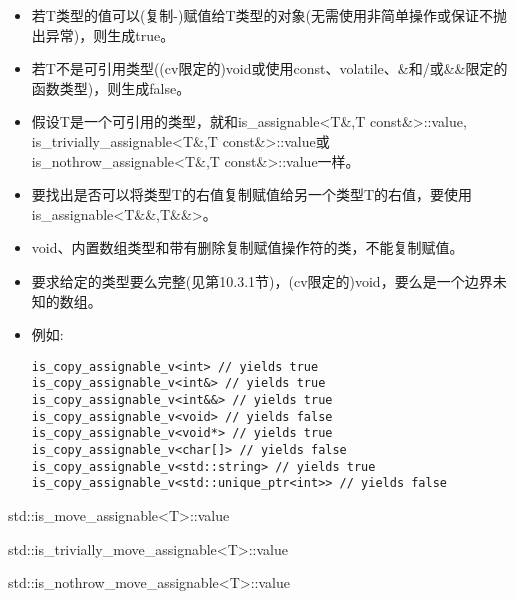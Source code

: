 \begin{itemize}
\item
若T类型的值可以(复制-)赋值给T类型的对象(无需使用非简单操作或保证不抛出异常)，则生成true。

\item
若T不是可引用类型((cv限定的)void或使用const、volatile、\&和/或\&\&限定的函数类型)，则生成false。
 
\item
假设T是一个可引用的类型，就和is\_assignable<T\&,T const\&>::value, is\_trivially\_assignable<T\&,T const\&>::value或is\_nothrow\_assignable<T\&,T const\&>::value一样。

\item
要找出是否可以将类型T的右值复制赋值给另一个类型T的右值，要使用is\_assignable<T\&\&,T\&\&>。


\item
void、内置数组类型和带有删除复制赋值操作符的类，不能复制赋值。

\item
要求给定的类型要么完整(见第10.3.1节)，(cv限定的)void，要么是一个边界未知的数组。

\item
例如:
\begin{lstlisting}[style=styleCXX]
is_copy_assignable_v<int> // yields true
is_copy_assignable_v<int&> // yields true
is_copy_assignable_v<int&&> // yields true
is_copy_assignable_v<void> // yields false
is_copy_assignable_v<void*> // yields true
is_copy_assignable_v<char[]> // yields false
is_copy_assignable_v<std::string> // yields true
is_copy_assignable_v<std::unique_ptr<int>> // yields false
\end{lstlisting}
\end{itemize}

std::is\_move\_assignable<T>::value

std::is\_trivially\_move\_assignable<T>::value

std::is\_nothrow\_move\_assignable<T>::value


